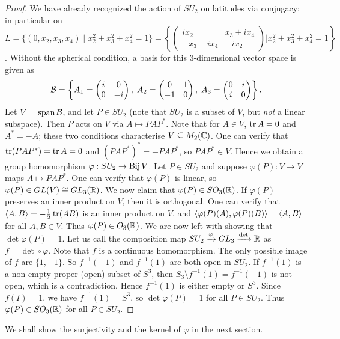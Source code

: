 \begin{proof}
    We have already recognized the action of $SU_{2}$ on latitudes via conjugacy; in particular on $L = \{(0,x_{2},x_{3},x_{4}) \mid x_{2}^{2} + x_{3}^{2} + x_{4}^{2} = 1\} = \left\{ \begin{pmatrix}
        ix_{2} & x_{3} + ix_{4} \\ -x_{3} + ix_{4} & -ix_{2}
    \end{pmatrix} \Big| x_{2}^{2} + x_{3}^{2} + x_{4}^{2} = 1 \right\}$. Without the spherical condition, a basis for this 3-dimensional vector space is given as
    \begin{align}
        \mathcal{B} = \left\{ A_{1} = \begin{pmatrix}
            i & 0 \\ 0 & -i
        \end{pmatrix},\; A_{2} = \begin{pmatrix}
            0 & 1 \\ -1 & 0
        \end{pmatrix},\; A_{3} = \begin{pmatrix}
            0 & i \\ i & 0
        \end{pmatrix} \right\}.
    \end{align}
    Let $V = \operatorname{span} \mathcal{B}$, and let $P \in SU_{2}$ (note that $SU_{2}$ is a subset of $V$, but \textit{not} a linear subspace). Then $P$ acts on $V$ via $A \mapsto PAP^{\ast}$. Note that for $A \in V$, $\operatorname{tr} A = 0$ and $A^{\ast} = -A$; these two conditions characterise $V \subseteq M_{2}(\mathbb{C})$. One can verify that $\operatorname{tr} (PAP^{\ast}) = \operatorname{tr} A = 0$ and $(PAP^{\ast})^{\ast} = -PAP^{\ast}$, so $PAP^{\ast} \in V$. Hence we obtain a group homomorphism $\varphi : SU_{2} \to \operatorname{Bij} V$. Let $P \in SU_{2}$ and suppose $\varphi(P):V \to V$ maps $A \mapsto PAP^{\ast}$. One can verify that $\varphi(P)$ is linear, so $\varphi(P) \in GL(V) \cong GL_{3}(\mathbb{R})$. We now claim that $\varphi(P) \in SO_{3}(\mathbb{R})$. If $\varphi(P)$ preserves an inner product on $V$, then it is orthogonal. One can verify that $\langle A,B\rangle = -\frac{1}{2}\operatorname{tr}(AB)$ is an inner product on $V$, and $\langle\varphi(P)(A),\varphi(P)(B)\rangle = \langle A,B\rangle$ for all $A,B \in V$. Thus $\varphi(P) \in O_{3}(\mathbb{R})$. We are now left with showing that $\det \varphi(P) = 1$. Let us call the composition map $SU_{2} \xrightarrow{\varphi} GL_{3} \xrightarrow{\det} \mathbb{R}$ as $f = \det \circ \varphi$. Note that $f$ is a continuous homomorphism. The only possible image of $f$ are $\{1,-1\}$. So $f^{-1}(-1)$ and $f^{-1}(1)$ are both open in $SU_{2}$. If $f^{-1}(1)$ is a non-empty proper (open) subset of $S^{3}$, then $S_{3}\setminus f^{-1}(1) = f^{-1}(-1)$ is not open, which is a contradiction. Hence $f^{-1}(1)$ is either empty or $S^{3}$. Since $f(I) = 1$, we have $f^{-1}(1) = S^{3}$, so $\det \varphi(P) = 1$ for all $P \in SU_{2}$. Thus $\varphi(P) \in SO_{3}(\mathbb{R})$ for all $P \in SU_{2}$.
\end{proof}
We shall show the surjectivity and the kernel of $\varphi$ in the next section.

